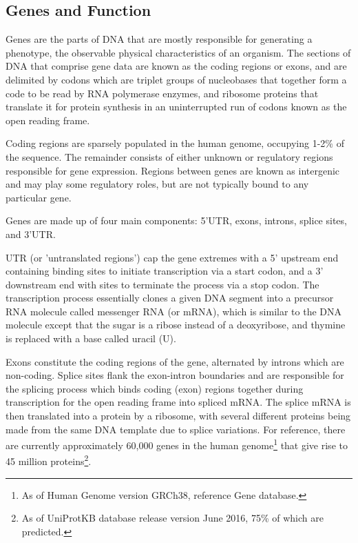 \subsection{Genes and Function}

Genes are the parts of DNA that are mostly responsible for generating a \gls{phenotype}, the observable physical characteristics of an organism. The sections of DNA that comprise gene data are known as the \gls{coding} regions or \gls{exons}, and are delimited by \gls{codons} which are triplet groups of nucleobases that together form a code to be read by \gls{RNA polymerase} enzymes, and \gls{ribosome} proteins that translate it for protein synthesis in an uninterrupted run of codons known as the \gls{open reading frame}.

Coding regions are sparsely populated in the human genome, occupying 1-2\% of the sequence. The remainder consists of either unknown or regulatory regions responsible for gene expression. Regions between genes are known as \gls{intergenic} and may play some regulatory roles, but are not typically bound to any particular gene.

Genes are made up of four main components: 5'UTR, exons, introns, splice sites, and 3'UTR.

\gls{UTR} (or 'untranslated regions') cap the gene extremes with a 5' upstream end containing binding sites to initiate \gls{transcription} via a \gls{start codon}, and a 3' downstream end with sites to terminate the process via a \gls{stop codon}. The transcription process essentially clones a given DNA segment into a precursor RNA molecule called messenger RNA (or \gls{mRNA}), which is similar to the DNA molecule except that the sugar is a ribose instead of a deoxyribose, and thymine is replaced with a base called \gls{uracil} (U).

Exons constitute the coding regions of the gene, alternated by introns which are non-coding. Splice sites flank the exon-intron boundaries and are responsible for the \gls{splicing} process which binds coding (exon) regions together during transcription for the open reading frame into spliced mRNA.  The splice mRNA is then \gls{translated} into a protein by a ribosome, with several different proteins being made from the same DNA template due to splice variations. For reference, there are currently approximately 60,000 genes in the human genome\footnote{As of Human Genome version GRCh38, reference Gene database.}  that give rise to 45 million proteins\footnote{As of UniProtKB database release  version June 2016, 75\% of which are predicted.}.

